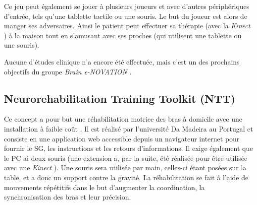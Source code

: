 		Ce jeu peut également se jouer à plusieurs joueurs et avec d'autres périphériques d'entrée, tels qu'une tablette tactile ou une souris. Le but du joueur est alors de manger ses adversaires. Ainsi le patient peut effectuer sa thérapie (avec la \textit{Kinect} \cite{Kinect_website}) à la maison tout en s'amusant avec ses proches (qui utilisent une tablette ou une souris).\medskip
		
		\begin{minipage}{\linewidth}
			\label{FigVoracyFish}
		\end{minipage}\medskip
		
		Aucune d'études clinique n'a encore été effectuée, mais c'est un des prochains objectifs du groupe \textit{Brain e-NOVATION} \cite{ICM_Strokes}.
	
	\subsection*{Neurorehabilitation Training Toolkit (NTT)}
		Ce concept a pour but une réhabilitation motrice des bras à domicile avec une installation à faible coût \cite{Bermudez_NTT}. Il est réalisé par l'université Da Madeira au Portugal et consiste en une application web accessible depuis un navigateur internet pour fournir le SG, les instructions et les retours d'informations. Il exige également que le PC ai deux souris (une extension a, par la suite, été réalisée pour être utilisée avec une \textit{Kinect} \cite{Bermudez_NTTToKinect}). Une souris sera utilisée par main, celles-ci étant posées sur la table, et a donc un support contre la gravité. La réhabilitation se fait à l'aide de mouvements répétitifs dans le but d'augmenter la coordination, la synchronisation des bras et leur précision.
		\\
		
